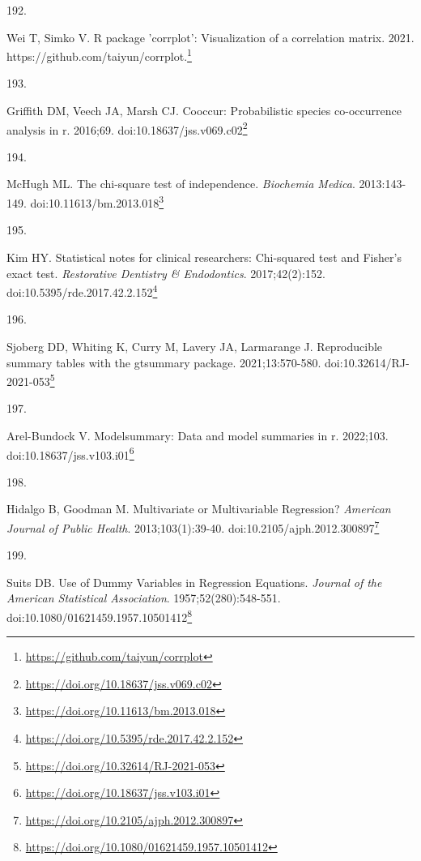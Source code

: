 \documentclass[
  a4paper,
]{book}
\newlength{\cslhangindent}
\newlength{\csllabelwidth}
\newlength{\cslentryspacingunit} %
\newenvironment{CSLReferences}[2] %
 {%
  \setlength{\parindent}{0pt}
  \ifodd #1
  \let\oldpar\par
  \def\par{\hangindent=\cslhangindent\oldpar}
  \fi
  \setlength{\parskip}{#2\cslentryspacingunit}
 }%
 {}
\newcommand{\CSLLeftMargin}[1]{\parbox[t]{\csllabelwidth}{#1}}
\newcommand{\CSLRightInline}[1]{\parbox[t]{\linewidth - \csllabelwidth}{#1}\break}
\renewcommand{\href}[2]{#2\footnote{\url{#1}}}
\begin{document}
\begin{CSLReferences}{0}{0}
\leavevmode{}%
\CSLLeftMargin{192. }%
\CSLRightInline{Wei T, Simko V. R package 'corrplot': Visualization of a correlation matrix. 2021. \href{https://github.com/taiyun/corrplot}{https://github.com/taiyun/corrplot.}}

\leavevmode{}%
\CSLLeftMargin{193. }%
\CSLRightInline{Griffith DM, Veech JA, Marsh CJ. {\textbraceleft}Cooccur{\textbraceright}: Probabilistic species co-occurrence analysis in {\textbraceleft}r{\textbraceright}. 2016;69. doi:\href{https://doi.org/10.18637/jss.v069.c02}{10.18637/jss.v069.c02}}

\leavevmode{}%
\CSLLeftMargin{194. }%
\CSLRightInline{McHugh ML. The chi-square test of independence. \emph{Biochemia Medica}. 2013:143-149. doi:\href{https://doi.org/10.11613/bm.2013.018}{10.11613/bm.2013.018}}

\leavevmode{}%
\CSLLeftMargin{195. }%
\CSLRightInline{Kim HY. Statistical notes for clinical researchers: Chi-squared test and Fisher's exact test. \emph{Restorative Dentistry \& Endodontics}. 2017;42(2):152. doi:\href{https://doi.org/10.5395/rde.2017.42.2.152}{10.5395/rde.2017.42.2.152}}

\leavevmode{}%
\CSLLeftMargin{196. }%
\CSLRightInline{Sjoberg DD, Whiting K, Curry M, Lavery JA, Larmarange J. Reproducible summary tables with the gtsummary package. 2021;13:570-580. doi:\href{https://doi.org/10.32614/RJ-2021-053}{10.32614/RJ-2021-053}}

\leavevmode{}%
\CSLLeftMargin{197. }%
\CSLRightInline{Arel-Bundock V. {\textbraceleft}Modelsummary{\textbraceright}: Data and model summaries in {\textbraceleft}r{\textbraceright}. 2022;103. doi:\href{https://doi.org/10.18637/jss.v103.i01}{10.18637/jss.v103.i01}}

\leavevmode{}%
\CSLLeftMargin{198. }%
\CSLRightInline{Hidalgo B, Goodman M. Multivariate or Multivariable Regression? \emph{American Journal of Public Health}. 2013;103(1):39-40. doi:\href{https://doi.org/10.2105/ajph.2012.300897}{10.2105/ajph.2012.300897}}

\leavevmode{}%
\CSLLeftMargin{199. }%
\CSLRightInline{Suits DB. Use of Dummy Variables in Regression Equations. \emph{Journal of the American Statistical Association}. 1957;52(280):548-551. doi:\href{https://doi.org/10.1080/01621459.1957.10501412}{10.1080/01621459.1957.10501412}}


\end{CSLReferences}
\end{document}
